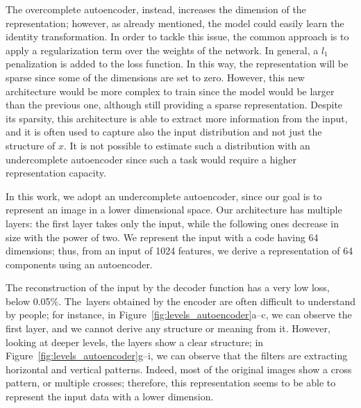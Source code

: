 The overcomplete autoencoder, instead, increases the dimension of the representation; however, as already mentioned, the model could easily learn the identity transformation. In order to tackle this issue, the common approach is to apply a regularization term over the weights of the network. In general, a $l_1$ penalization is added to the loss function.
In this way, the representation will be sparse since some of the dimensions are set to zero.
However, this new architecture would be more complex to train since the model would be larger than the previous one, although still providing a sparse representation.
Despite its sparsity, this architecture is able to extract more information from the input, and it is often used to capture also the input distribution and not just the structure of $x$. It is not possible to estimate such a distribution with an undercomplete autoencoder since such a task would require a higher representation capacity.

In this work, we adopt an undercomplete autoencoder, since our goal is to represent an image in a lower dimensional space. 
Our architecture has multiple layers: the first layer takes only the input, while the following ones decrease in size with the power of two.
We represent the input with a code having 64 dimensions; thus, from an input of 1024 features, we derive a representation of 64 components using an autoencoder.

The reconstruction of the input by the decoder function has a very low loss, below 0.05$\%$. The~layers obtained by the encoder are often difficult to understand by people; for instance, in Figure~\ref{fig:levels_autoencoder}a--c, we can observe the first layer, and we cannot derive any structure or meaning from it.
However, looking at deeper levels, the layers show a clear structure; in Figure~\ref{fig:levels_autoencoder}g--i, we can observe that the filters are extracting horizontal and vertical patterns. Indeed, most of the original images show a cross pattern, or multiple crosses; therefore, this representation seems to be able to represent the input data with a lower dimension.

